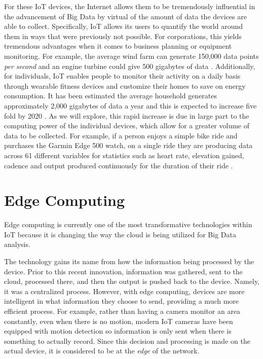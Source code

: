 \documentclass[sigconf]{acmart}
\begin{document}
For these IoT devices, the Internet allows them to be tremendously influential in the advancement of Big Data by virtual of the amount of data the devices are able to collect. Specifically, IoT allows its users to quantify the world around them in ways that were previously not possible. For corporations, this yields tremendous advantages when it comes to business planning or equipment monitoring. For example, the average wind farm can generate 150,000 data points \emph{per second} and an engine turbine could give 500 gigabytes of data \cite{wind}. Additionally, for individuals, IoT enables people to monitor their activity on a daily basis through wearable fitness devices and customize their homes to save on energy consumption. It has been estimated the average household generates approximately 2,000 gigabytes of data a year and this is expected to increase five fold by 2020 \cite{iotdata}. As we will explore, this rapid increase is due in large part to the computing power of the individual devices, which allow for a greater volume of data to be collected. For example, if a person enjoys a simple bike ride and purchases the Garmin Edge 500 watch, on a single ride they are producing data across 61 different variables for statistics such as heart rate, elevation gained, cadence and output produced continuously for the duration of their ride \cite{garmin}.


\section{Edge Computing}

Edge computing is currently one of the most transformative technologies within IoT because it is changing the way the cloud is being utilized for Big Data analysis. 

The technology gains its name from how the information being processed by the device.  Prior to this recent innovation, information was gathered, sent to the cloud, processed there, and then the output is pushed back to the device. Namely, it was a centralized process. However, with edge computing, devices are more intelligent in what information they choose to send, providing a much more efficient process. For example, rather than having a camera monitor an area constantly, even when there is no motion, modern IoT cameras have been equipped with motion detection so information is only sent when there is something to actually record. Since this decision and processing is made on the actual device, it is considered to be at the \emph{edge} of the network.
\end{document}
